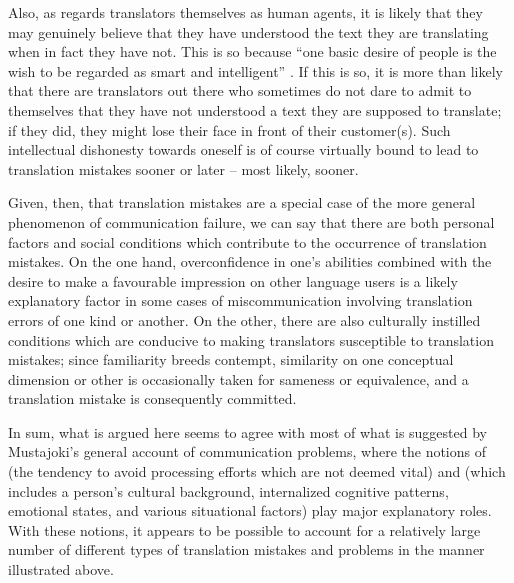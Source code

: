 \documentclass[output=paper]{LSP/langsci}
\begin{document}
  
  Also, as regards translators themselves as human agents, it is likely that they may genuinely believe that they have understood the text they are translating when in fact they have not. This is so because ``one basic desire of people is the wish to be regarded as smart and intelligent'' \citep[230]{Mustajoki2012}. If this is so, it is more than likely that there are translators out there who sometimes do not dare to admit to themselves that they have not understood a text they are supposed to translate; if they did, they might lose their face in front of their customer(s). Such intellectual dishonesty towards oneself is of course virtually bound to lead to translation mistakes sooner or later -- most likely, sooner.

  
  Given, then, that translation mistakes are a special case of the more general phenomenon of communication failure, we can say that there are both personal factors and social conditions which contribute to the occurrence of translation mistakes. On the one hand, overconfidence in one's abilities combined with the desire to make a favourable impression on other language users is a likely explanatory factor in some cases of miscommunication involving translation errors of one kind or another. On the other, there are also culturally instilled conditions which are conducive to making translators susceptible to translation mistakes; since familiarity breeds contempt, similarity on one conceptual dimension or other is occasionally taken for sameness or equivalence, and a translation mistake is consequently committed.

  
  In sum, what is argued here seems to agree with most of what is suggested by Mustajoki's \citeyearpar{Mustajoki2012} general account of communication problems, where the notions of  (the tendency to avoid processing efforts which are not deemed vital) and  (which includes a person's cultural background, internalized cognitive patterns, emotional states, and various situational factors) play major explanatory roles. With these notions, it appears to be possible to account for a relatively large number of different types of translation mistakes and problems in the manner illustrated above.

\sloppy  
\printbibliography[heading=subbibliography,notkeyword=this]
\end{document}
